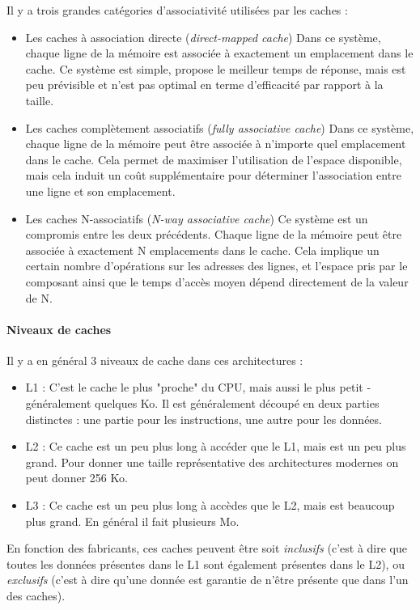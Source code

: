 Il y a trois grandes catégories d'associativité utilisées par les caches :
\begin{itemize}
  \item Les caches à association directe (\emph{direct-mapped cache})
    Dans ce système, chaque ligne de la mémoire est associée à exactement un emplacement dans le cache.
    Ce système est simple, propose le meilleur temps de réponse, mais est peu prévisible et n'est pas optimal en terme d'efficacité par rapport à la taille.
  \item Les caches complètement associatifs (\emph{fully associative cache})
    Dans ce système, chaque ligne de la mémoire peut être associée à n'importe quel emplacement dans le cache.
    Cela permet de maximiser l'utilisation de l'espace disponible, mais cela induit un coût supplémentaire pour déterminer l'association entre une ligne et son emplacement.
  \item Les caches N-associatifs (\emph{N-way associative cache})
    Ce système est un compromis entre les deux précédents.
    Chaque ligne de la mémoire peut être associée à exactement N emplacements dans le cache.
    Cela implique un certain nombre d'opérations sur les adresses des lignes, et l'espace pris par le composant ainsi que le temps d'accès moyen dépend directement de la valeur de N.
\end{itemize}


\paragraph{Niveaux de caches}

Il y a en général 3 niveaux de cache dans ces architectures :
\begin{itemize}
  \item L1 : C'est le cache le plus "proche" du CPU, mais aussi le plus petit - généralement quelques Ko. Il est généralement découpé en deux parties distinctes : une partie pour les instructions, une autre pour les données.
  \item L2 : Ce cache est un peu plus long à accéder que le L1, mais est un peu plus grand. Pour donner une taille représentative des architectures modernes on peut donner 256 Ko.
  \item L3 : Ce cache est un peu plus long à accèdes que le L2, mais est beaucoup plus grand. En général il fait plusieurs Mo.
\end{itemize}

En fonction des fabricants, ces caches peuvent être soit \emph{inclusifs} (c'est à dire que toutes les données présentes dans le L1 sont également présentes dans le L2), ou \emph{exclusifs} (c'est à dire qu'une donnée est garantie de n'être présente que dans l'un des caches).

